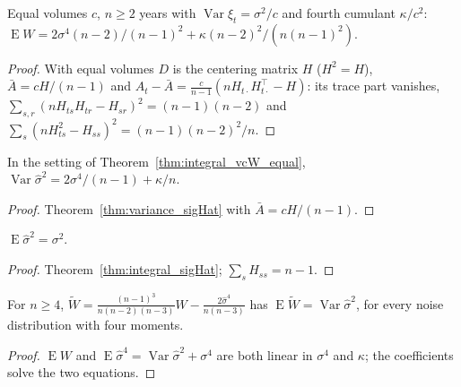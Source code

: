 \begin{theorem}\label{thm:integral_vcW_equal}
  \leanok
  Equal volumes $c$, $n \ge 2$ years with $\operatorname{Var}\xi_t = \sigma^2/c$ and fourth cumulant
  $\kappa/c^2$: $\operatorname{E}W = 2\sigma^4(n-2)/(n-1)^2 + \kappa(n-2)^2/(n(n-1)^2)$.
\end{theorem}
\begin{proof}
  \leanok
  With equal volumes $D$ is the centering matrix $H$ ($H^2 = H$), $\bar A = cH/(n-1)$ and
  $A_t - \bar A = \tfrac{c}{n-1}(nH_{t\cdot}H_{t\cdot}^\top - H)$: its trace part vanishes,
  $\sum_{s,r}(nH_{ts}H_{tr} - H_{sr})^2 = (n-1)(n-2)$ and $\sum_s(nH_{ts}^2 - H_{ss})^2 = (n-1)(n-2)^2/n$.
\end{proof}

\begin{theorem}\label{thm:variance_sigHat_equal}
  \leanok
  In the setting of Theorem~\ref{thm:integral_vcW_equal}, $\operatorname{Var}\hat\sigma^2 = 2\sigma^4/(n-1) + \kappa/n$.
\end{theorem}
\begin{proof}
  \leanok
  Theorem~\ref{thm:variance_sigHat} with $\bar A = cH/(n-1)$.
\end{proof}

\begin{theorem}\label{thm:integral_sigHat_equal}
  \leanok
  $\operatorname{E}\hat\sigma^2 = \sigma^2$.
\end{theorem}
\begin{proof}
  \leanok
  Theorem~\ref{thm:integral_sigHat}; $\sum_s H_{ss} = n - 1$.
\end{proof}

\begin{theorem}\label{thm:integral_vcWCorr_equal}
  \leanok
  For $n \ge 4$, $\tilde W = \frac{(n-1)^3}{n(n-2)(n-3)}W - \frac{2\hat\sigma^4}{n(n-3)}$ has
  $\operatorname{E}\tilde W = \operatorname{Var}\hat\sigma^2$, for every noise distribution with four moments.
\end{theorem}
\begin{proof}
  \leanok
  $\operatorname{E}W$ and $\operatorname{E}\hat\sigma^4 = \operatorname{Var}\hat\sigma^2 + \sigma^4$ are both
  linear in $\sigma^4$ and $\kappa$; the coefficients solve the two equations.
\end{proof}


